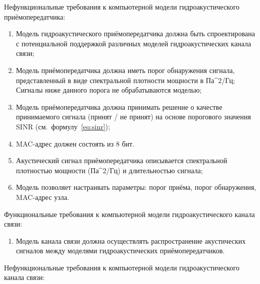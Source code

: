 \documentclass[
    numbers=section,
    document-code={ВКРБ--09.03.04--10.19--XX--26--81}
]{../latex/fqw}
\begin{document}
    Нефункциональные требования к компьютерной модели гидроакустического приёмопередатчика:

    \begin{enumerate}
        \def\labelenumi{\arabic{enumi}.}
        \item
        Модель гидроакустического приёмопередатчика должна быть
        спроектирована с потенциальной поддержкой различных моделей гидроакустических канала связи;
        \item
        Модель приёмопередатчика должна
        иметь порог обнаружения сигнала, представленный в виде спектральной плотности мощности в Па\^{}2/Гц;
        Сигналы ниже данного порога не обрабатываются моделью;
        \item
        Модель приёмопередатчика должна
        принимать решение о качестве принимаемого сигнала (принят / не принят)
        на основе порогового значения SINR (см.\ формулу~\eqref{eq:sinr});
        \item MAC-адрес должен состоять из 8 бит.
        \item
        Акустический сигнал приёмопередатчика описывается
        спектральной плотностью мощности (Па\^{}2/Гц) и длительностью сигнала;
        \item
        Модель позволяет настраивать параметры:
        порог приёма,
        порог
        обнаружения,
        MAC-адрес узла.
    \end{enumerate}

    Функциональные требования к компьютерной модели гидроакустического канала связи:

    \begin{enumerate}
        \def\labelenumi{\arabic{enumi}.}
        \item
        Модель канала связи
        должна осуществлять распространение акустических сигналов между моделями гидроакустических приёмопередатчиков.
    \end{enumerate}

    Нефункциональные требования к компьютерной модели гидроакустического канала связи:
\end{document}

